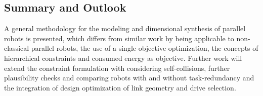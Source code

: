 \documentclass[fleqn,a4paper,10pt]{article}
\begin{document}
\begin{multicols}{2}




\section{Summary and Outlook}
\label{sec:summary}

A general methodology for the modeling and dimensional synthesis of parallel robots is presented, which differs from similar work by being applicable to non-classical parallel robots, the use of a single-objective optimization, the concepts of hierarchical constraints and consumed energy as objective. 
Further work will extend the constraint formulation with considering self-collisions, further plausibility checks and comparing robots with and without task-redundancy and the integration of design optimization of link geometry and drive selection.


\end{multicols}
\end{document}
